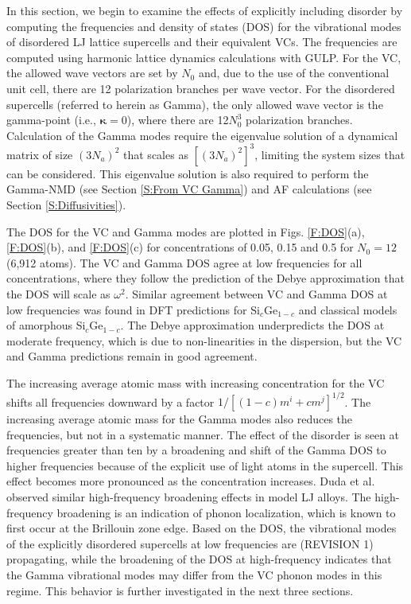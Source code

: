 \documentclass[aps,prb,onecolumn,preprint,footinbib,superscriptaddress,amsmath,amssymb,floatfix]{revtex4}
\begin{document}
In this section, we begin to examine the effects of explicitly including 
disorder by computing the frequencies and density of states (DOS)  
for the vibrational modes of disordered LJ lattice supercells and their 
equivalent VCs. The frequencies 
are computed using harmonic lattice dynamics calculations with  
GULP.\cite{gale_general_2003}  For the 
VC, the allowed wave vectors are set by $N_0$ and, due to the use of the 
conventional unit cell, there are 12 
polarization branches per wave vector.  
For the disordered supercells (referred to herein as Gamma),
the only allowed wave vector is the gamma-point (i.e., $\pmb{\kappa}=0$),  
where there are 12$N_0^3$ polarization branches. Calculation of the 
Gamma modes require the eigenvalue solution of a dynamical matrix of size 
$(3N_a)^2$ that scales as $[(3N_a)^2]^3$, limiting the system 
sizes that can be considered. This eigenvalue solution is also 
required to perform the Gamma-NMD (see Section \ref{S:From VC Gamma})  
and AF calculations (see Section \ref{S:Diffusivities}). 

The DOS for the VC and Gamma modes are plotted in Figs. \ref{F:DOS}(a), 
\ref{F:DOS}(b), and \ref{F:DOS}(c) 
for concentrations of 0.05, 0.15 and 0.5 for 
$N_0=12$ (6,912 atoms). The VC and Gamma DOS 
agree at low frequencies for all concentrations, 
where they follow the prediction of the Debye approximation that 
the DOS will scale as $\omega^2$.\cite{ashcroft_solid_1976} 
Similar agreement between VC and Gamma DOS at low frequencies 
was found in DFT predictions 
for Si$_c$Ge$_{1-c}$\cite{garg_role_2011} and 
classical models of amorphous Si$_c$Ge$_{1-c}$.
\cite{bouchard_vibrational_1988} The Debye approximation 
underpredicts the DOS at moderate frequency, which is due to 
non-linearities in the dispersion,\cite{ashcroft_solid_1976} but the 
VC and Gamma predictions remain in good agreement. 

The increasing average atomic  
mass with increasing concentration for the VC shifts all   
frequencies downward by a factor $1/[(1-c)m^i + cm^j]^{1/2}$. 
The increasing average atomic 
mass for the Gamma modes also reduces the frequencies, but not in a 
systematic manner. 
The effect of the disorder is seen at frequencies greater than 
ten by a broadening and shift of the Gamma DOS to higher frequencies 
because of the explicit use of light atoms in the supercell. This effect 
becomes more pronounced as the concentration increases.  
Duda et al. 
observed similar high-frequency broadening effects in model LJ alloys.
\cite{duda_reducing_2011} The high-frequency broadening is an indication 
of phonon localization, which is known to first occur at the 
Brillouin zone edge.\cite{chu_effect_1989} 
Based on the DOS, the vibrational modes of the explicitly disordered 
supercells at low frequencies are (REVISION 1) propagating, while the 
broadening of the DOS at high-frequency indicates that the Gamma 
vibrational modes may differ from the VC phonon modes in this regime. 
This behavior is further investigated in the next three sections. 
\end{document}
